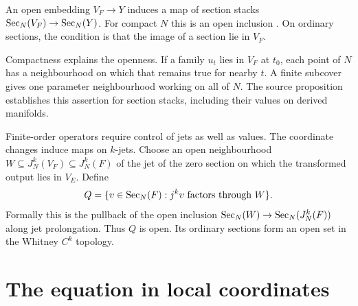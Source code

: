 
An open embedding $V_F\to Y$ induces a map of section stacks
$\operatorname{Sec}_N(V_F)\to\operatorname{Sec}_N(Y)$.
For compact $N$ this is an open inclusion
\cite[Proposition~3.2.19]{Steffens_Representability_Elliptic_Moduli}.
On ordinary sections, the condition is that the image of a section
lie in $V_F$.

Compactness explains the openness. If a family $u_t$ lies in $V_F$
at $t_0$, each point of $N$ has a neighbourhood on which that remains
true for nearby $t$. A finite subcover gives one parameter
neighbourhood working on all of $N$.
The source proposition establishes this assertion for section stacks,
including their values on derived manifolds.

Finite-order operators require control of jets as well as values.
The coordinate changes induce maps on $k$-jets. Choose an open
neighbourhood $W\subseteq J_N^k(V_F)\subseteq J_N^k(F)$ of the jet of
the zero section on which the transformed output lies in $V_E$.
Define
\[
 Q=\{v\in\operatorname{Sec}_N(F):j^kv\text{ factors through }W\}.
\]
Formally this is the pullback of the open inclusion
$\operatorname{Sec}_N(W)\to\operatorname{Sec}_N(J_N^k(F))$ along jet prolongation.
Thus $Q$ is open. Its ordinary sections form an open set in the
Whitney $C^k$ topology.

\section{The equation in local coordinates}

